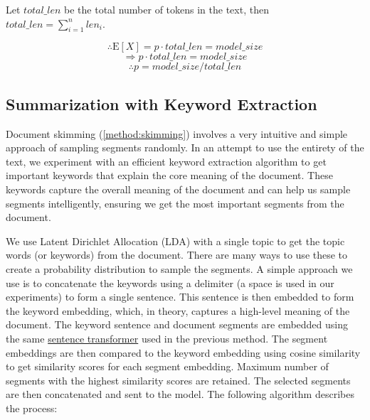 			Let $total\_len$ be the total number of tokens in the text, then
			$total\_len = \sum_{i = 1}^{n} len_i$.

			\[ \therefore \mathrm{E}[X] = p \cdot total\_len = model\_size \]
			\[ \Rightarrow p \cdot total\_len = model\_size \]
			\[ \therefore p = model\_size / total\_len \]


	\subsection{Summarization with Keyword Extraction}
		\label{method:keyword}

		Document skimming (\ref{method:skimming}) involves a very intuitive and simple approach of
		sampling segments randomly.
		In an attempt to use the entirety of the text, we experiment with an efficient keyword extraction
		algorithm to get important keywords that explain the core meaning of the document.
		These keywords capture the overall meaning of the document and can help us sample segments
		intelligently, ensuring we get the most important segments from the document.

		We use Latent Dirichlet Allocation (LDA) \cite{blei2003latent} with a single topic to get the
		topic words (or keywords) from the document.
		There are many ways to use these to create a probability distribution to sample the segments.
		A simple approach we use is to concatenate the keywords using a delimiter (a space is used in our
		experiments) to form a single sentence.
		This sentence is then embedded to form the keyword embedding, which, in theory, captures a
		high-level meaning of the document.
		The keyword sentence and document segments are embedded using the same
		\href{https://huggingface.co/sentence-transformers/all-MiniLM-L6-v2}{sentence transformer}
		used in the previous method.
		The segment embeddings are then compared to the keyword embedding using cosine similarity
		to get similarity scores for each segment embedding.
		Maximum number of segments with the highest similarity scores are retained.
		The selected segments are then concatenated and sent to the model.
		The following algorithm describes the process:

